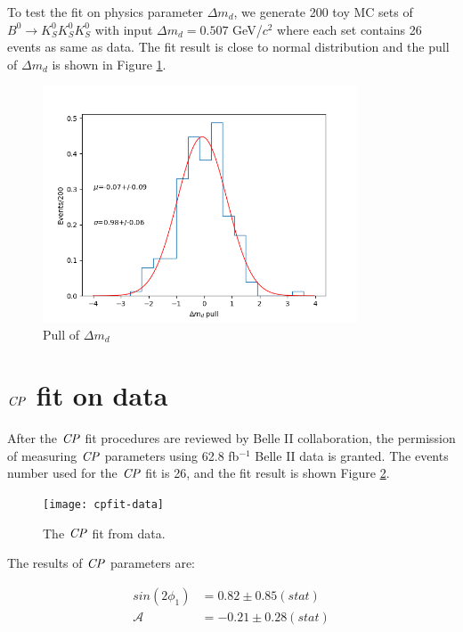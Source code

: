 To test the fit on physics parameter $\Delta m_d$, we generate 200 toy MC sets of $B^0 \to K_S^0  K_S^0  K_S^0$ with input $\Delta m_d = 0.507 $ GeV/$c^2$ where each set contains 26 events as same as data. The fit result is close to normal distribution and the pull of $\Delta m_d$ is shown in Figure \ref{fig:cpfit_dm_pull}. 
\begin{figure}[H]
	\centering
	\includegraphics[height=7cm]{figures/pull_hist_dm}
	\caption{Pull of $\Delta m_d$}
	\label{fig:cpfit_dm_pull}
\end{figure}

\section{$\it{CP}$ fit on data}
After the $\it{CP}$ fit procedures are reviewed by Belle II collaboration, the permission of measuring $\it{CP}$ parameters using 62.8 fb$^{-1}$ Belle II data is granted. The events number used for the $\it{CP}$ fit is 26, and the fit result is shown Figure \ref{fig:cpfit_data}.

\begin{figure}[H]
	\centering
	\texttt{[image: cpfit-data]}
	\caption{The $\it{CP}$ fit from data.}
	\label{fig:cpfit_data}
\end{figure}

The results of $\it{CP}$ parameters are: 

\begin{equation}
\begin{split}
sin(2\phi_1) & = 0.82 \pm 0.85(stat) \\
\mathcal{A} & = -0.21 \pm 0.28(stat) \\
\end{split}
\end{equation} 

